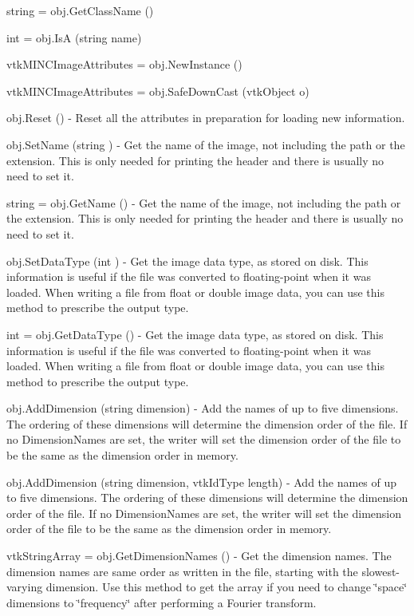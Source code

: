\begin{DoxyItemize}
\item {\ttfamily string = obj.\-Get\-Class\-Name ()}  
\item {\ttfamily int = obj.\-Is\-A (string name)}  
\item {\ttfamily vtk\-M\-I\-N\-C\-Image\-Attributes = obj.\-New\-Instance ()}  
\item {\ttfamily vtk\-M\-I\-N\-C\-Image\-Attributes = obj.\-Safe\-Down\-Cast (vtk\-Object o)}  
\item {\ttfamily obj.\-Reset ()} -\/ Reset all the attributes in preparation for loading new information.  
\item {\ttfamily obj.\-Set\-Name (string )} -\/ Get the name of the image, not including the path or the extension. This is only needed for printing the header and there is usually no need to set it.  
\item {\ttfamily string = obj.\-Get\-Name ()} -\/ Get the name of the image, not including the path or the extension. This is only needed for printing the header and there is usually no need to set it.  
\item {\ttfamily obj.\-Set\-Data\-Type (int )} -\/ Get the image data type, as stored on disk. This information is useful if the file was converted to floating-\/point when it was loaded. When writing a file from float or double image data, you can use this method to prescribe the output type.  
\item {\ttfamily int = obj.\-Get\-Data\-Type ()} -\/ Get the image data type, as stored on disk. This information is useful if the file was converted to floating-\/point when it was loaded. When writing a file from float or double image data, you can use this method to prescribe the output type.  
\item {\ttfamily obj.\-Add\-Dimension (string dimension)} -\/ Add the names of up to five dimensions. The ordering of these dimensions will determine the dimension order of the file. If no Dimension\-Names are set, the writer will set the dimension order of the file to be the same as the dimension order in memory.  
\item {\ttfamily obj.\-Add\-Dimension (string dimension, vtk\-Id\-Type length)} -\/ Add the names of up to five dimensions. The ordering of these dimensions will determine the dimension order of the file. If no Dimension\-Names are set, the writer will set the dimension order of the file to be the same as the dimension order in memory.  
\item {\ttfamily vtk\-String\-Array = obj.\-Get\-Dimension\-Names ()} -\/ Get the dimension names. The dimension names are same order as written in the file, starting with the slowest-\/varying dimension. Use this method to get the array if you need to change \char`\"{}space\char`\"{} dimensions to \char`\"{}frequency\char`\"{} after performing a Fourier transform.  

\end{DoxyItemize}
